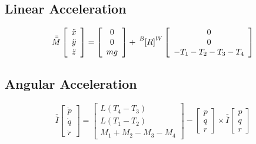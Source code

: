 \documentclass{article}
\numberwithin{equation}{section}
\newcommand{\BtoW}{
\tensor[^B]{\left[R\right]}{^W}
}
\newcommand{\omegaVec}{
\left[ \begin{array}{ccc}
p\\
q\\
r \end{array} \right]
}
\begin{document}
\subsection{Linear Acceleration}

\begin{equation}
  \label{linAccel}
  \bar{\bar{M}} \left[ \begin{array}{ccc} 
           \ddot{x} \\ 
           \ddot{y} \\ 
           \ddot{z} \end{array} \right] 
           =
   \left[ \begin{array}{ccc}
          0 \\
          0 \\
          mg \end{array} \right]
          +
    \BtoW \left[\begin{array}{ccc}
         0 \\
         0 \\
         -T_1 - T_2 - T_3 - T_4
         \end{array}\right]
\end{equation}

\subsection{Angular Acceleration}
\begin{equation}
  \label{angAccel}
  \bar{\bar{I}} \left[ \begin{array}{ccc} \dot{p} \\ 
  							\dot{q} \\ 
							\dot{r} \end{array} \right]
  =
  \left[ \begin{array}{ccc} L\left(T_4 - T_3\right) \\ 
  				      L\left(T_1 - T_2\right) \\ 
				      M_1 + M_2 - M_3 - M_4 \end{array} \right]
				      -
				      \omegaVec \times \bar{\bar{I}} \omegaVec
\end{equation}

\end{document}
